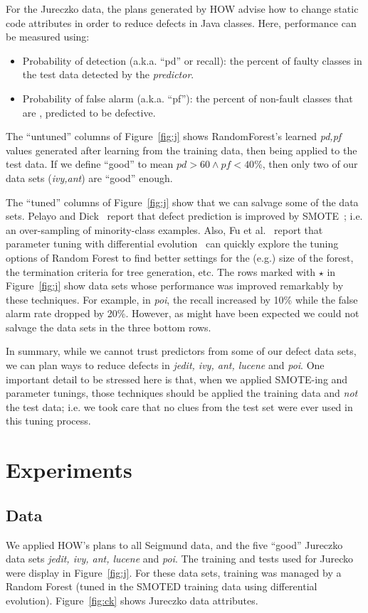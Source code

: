 \documentclass[conference]{IEEEtran}
\newcommand{\bi}{\begin{itemize}}
\newcommand{\ei}{\end{itemize}}
\newcommand{\fig}[1]{Figure~\ref{fig:#1}}
\begin{document}
For the  Jureczko   data,
the plans generated by HOW advise   how to change static code attributes in order to reduce defects in
Java classes.  Here,
performance can be measured using:
\bi
\item Probability of detection (a.k.a. ``pd'' or recall):  the percent of faulty classes in
the test data detected
by the {\em predictor}.
\item Probability of false alarm (a.k.a. ``pf''): the percent of non-fault
classes that are {\e, predicted} to be defective.
\ei 
The ``untuned'' columns of \fig{j} shows RandomForest's learned {\em pd,pf}
values generated after learning from the training data, then being applied to the test data.
If we define ``good'' to mean $\mathit{pd}>60 \wedge \mathit{pf} < 40$\%,
then only two of our data sets ({\em ivy,ant}) are ``good'' enough. 

The ``tuned'' columns of \fig{j} show that we can salvage some of the data sets.
 Pelayo and Dick~\cite{pelayo07} report that defect prediction is improved by SMOTE~\cite{Chawla2002}; i.e. an over-sampling of minority-class examples.
 Also, Fu et al.~\cite{fu:ase15} report that parameter tuning with differential evolution~\cite{storn97}
can quickly explore the tuning
options of Random Forest to find better settings for the (e.g.) size of the forest, the termination criteria
for tree generation, etc.
The rows marked with $\star$ in \fig{j} show data sets whose performance was improved remarkably by these
techniques. For example, in {\em poi}, the recall increased by 10\% while the false alarm rate dropped by 20\%.
However,  as might have been  expected
we could not salvage the data sets in the  three bottom rows.

In summary, while we cannot trust predictors from some of our defect data sets,
we can plan ways to reduce defects in {\em jedit, ivy, ant, lucene} and {\em poi}.
One important detail to be stressed here is that, when we applied    SMOTE-ing and
parameter tunings, those techniques should be applied the training data and {\em not}
the test data;  
i.e.
we took care that no clues from the test set were ever used in this tuning process.


 

\section{Experiments}

\subsection{Data}
We applied HOW's plans to all  Seigmund data, and the five ``good''
  Jureczko   data sets {\em jedit, ivy, ant, lucene} and {\em poi}.
  The training and tests used for Jurecko were display in \fig{j}. For these data
  sets, training was managed by a Random Forest (tuned in the SMOTED training data using differential
  evolution). \fig{ck} shows Jureczko data attributes.
  
\end{document}
